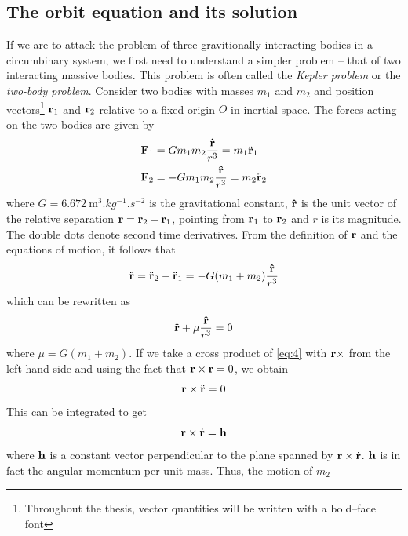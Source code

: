 \documentclass[ twoside,openright,titlepage,numbers=noenddot,headinclude,%
                footinclude=true,cleardoublepage=empty,abstractoff, %
                BCOR=5mm,paper=a4,fontsize=11pt,%
                american,%
                ]{scrreprt}
\begin{document}
\subsection{The orbit equation and its solution}
If we are to attack the problem of three gravitionally interacting
bodies in a circumbinary system, we first need to understand a simpler 
problem -- that of two interacting massive bodies. This problem is often called 
the \emph{Kepler problem} or the \emph{two-body problem}. Consider two bodies with masses
$m_1$ and $m_2$ and position vectors\footnote{Throughout the thesis,
vector quantities will be written with a bold--face font}
$\boldsymbol{\mathbf{r}}_1$ and $\boldsymbol{\mathbf{r}}_2$ relative to a fixed origin $O$ in
inertial space. The forces acting on the two bodies are given by
\begin{align}
    \boldsymbol{\mathbf{F}}_1 &= Gm_1m_2 \frac{\boldsymbol{\mathbf{\hat{r}}}}{r^3} = m_1\ddot{\boldsymbol{\mathbf{r}}}_1\\
    \boldsymbol{\mathbf{F}}_2 &= -Gm_1m_2 \frac{\boldsymbol{\mathbf{\hat{r}}}}{r^3}= m_2\ddot{\boldsymbol{\mathbf{r}}}_2
\end{align}
where $G=\SI{6.672}{\meter^3.kg^{-1}.s^{-2}}$ is the gravitational constant,
$\boldsymbol{\mathbf{\hat{r}}}$ is the unit vector of the relative separation
$\boldsymbol{\mathbf{r}}=\boldsymbol{\mathbf{r}}_2 - \boldsymbol{\mathbf{r}}_1$, pointing from $\boldsymbol{\mathbf{r}}_1$ to $\boldsymbol{\mathbf{r}}_2$
and $r$ is its magnitude. 
The double dots denote second time derivatives. From the definition of $\boldsymbol{\mathbf{r}}$ 
and the equations of motion, it follows that
\begin{equation}
    \ddot{\boldsymbol{\mathbf{r}}}=\ddot{\boldsymbol{\mathbf{r}}}_2 - \ddot{\boldsymbol{\mathbf{r}}}_1=-G(m_1+m_2)
    \frac{\boldsymbol{\mathbf{\hat{r}}}}{r^3} \\
\end{equation}
which can be rewritten as
\begin{equation}
    \ddot{\boldsymbol{\mathbf{r}}} + \mu \frac{\boldsymbol{\mathbf{\hat{r}}}}{r^3} =0 \label{eq:4}
\end{equation}
where $\mu=G(m_1+m_2)$. If we take a cross product of \cref{eq:4} with
$\boldsymbol{\mathbf{r}}\times$ from the left-hand side and using the fact that 
$\boldsymbol{\mathbf{r}}\times\boldsymbol{\mathbf{r}}=0$, we obtain
\begin{equation}
\boldsymbol{\mathbf{r}}\times\ddot{\boldsymbol{\mathbf{r}}}=0
\end{equation}
This can be integrated to get
\begin{equation}
    \boldsymbol{\mathbf{r}}\times\dot{\boldsymbol{\mathbf{r}}}=\boldsymbol{\mathbf{h}}
    \label{eq:6}
\end{equation}
where $\boldsymbol{\mathbf{h}}$ is a constant vector perpendicular to the plane spanned 
by $\boldsymbol{\mathbf{r}}\times\dot{\boldsymbol{\mathbf{r}}}$. $\boldsymbol{\mathbf{h}}$ is in fact the angular momentum
per unit mass. Thus, the motion of $m_2$
\end{document}
